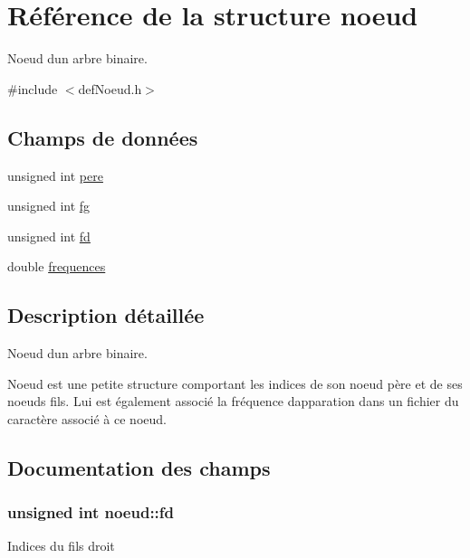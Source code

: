 \hypertarget{structnoeud}{}\section{Référence de la structure noeud}
\label{structnoeud}


Noeud d\textquotesingle{}un arbre binaire.  




{\ttfamily \#include $<$def\+Noeud.\+h$>$}

\subsection*{Champs de données}
\begin{DoxyCompactItemize}
\item 
unsigned int \hyperlink{structnoeud_aa5b03ff1fc332c2390f0324398c0ee1d}{pere}
\item 
unsigned int \hyperlink{structnoeud_ae14c26edcd37240fc9f8e3769d55d3e5}{fg}
\item 
unsigned int \hyperlink{structnoeud_a72ced58e381fdf4144d295884dcd7168}{fd}
\item 
double \hyperlink{structnoeud_a27b27306f715b45b8f8e47bb35ad3859}{frequences}
\end{DoxyCompactItemize}


\subsection{Description détaillée}
Noeud d\textquotesingle{}un arbre binaire. 

Noeud est une petite structure comportant les indices de son noeud père et de ses noeuds fils. Lui est également associé la fréquence d\textquotesingle{}apparation dans un fichier du caractère associé à ce noeud. 

\subsection{Documentation des champs}
\subsubsection[{\texorpdfstring{fd}{fd}}]{\setlength{\rightskip}{0pt plus 5cm}unsigned int noeud\+::fd}\hypertarget{structnoeud_a72ced58e381fdf4144d295884dcd7168}{}\label{structnoeud_a72ced58e381fdf4144d295884dcd7168}
Indices du fils droit 
